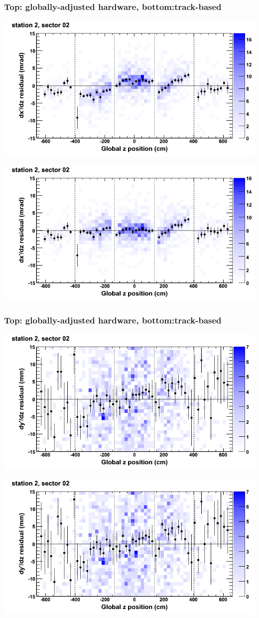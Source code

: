 \documentclass[compress]{beamer}
\begin{document}
\begin{frame}
\frametitle{Top: globally-adjusted hardware, bottom:track-based}
\includegraphics[width=0.7\linewidth]{NOV4_mapplots_HW/DTvsz_st2sec02_dxdz.png}

\includegraphics[width=0.7\linewidth]{NOV4_mapplots/DTvsz_st2sec02_dxdz.png}
\end{frame}

\begin{frame}
\frametitle{Top: globally-adjusted hardware, bottom:track-based}
\includegraphics[width=0.7\linewidth]{NOV4_mapplots_HW/DTvsz_st2sec02_dydz.png}

\includegraphics[width=0.7\linewidth]{NOV4_mapplots/DTvsz_st2sec02_dydz.png}
\end{frame}
\end{document}
